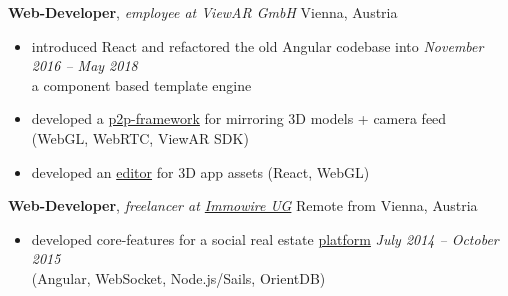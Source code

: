 \documentclass[9pt]{extarticle}
\begin{document}
\noindent
{\bf Web-Developer}, \textit{employee at ViewAR GmbH}  \hfill Vienna, Austria
\begin{itemize}
\setlength\itemsep{0.05em}
    \item introduced React and refactored the old Angular codebase into \hfill \textit{November 2016 -- May 2018} \\
    a component based template engine
    \item developed a \href{https://www.youtube.com/watch?v=0j-v-j9xEUQ}{p2p-framework} for mirroring 3D models + camera feed \\
    (WebGL, WebRTC, ViewAR SDK)
    \item developed an \href{https://www.youtube.com/watch?v=quE-erJ4PmU&t=113s}{editor} for 3D app assets (React, WebGL) \\
\end{itemize}

\noindent
{\bf Web-Developer}, \textit{freelancer at \href{https://youtu.be/cs-IyI_erZo?t=16}{Immowire UG}}  \hfill Remote from Vienna, Austria
\begin{itemize}
    \setlength\itemsep{0.05em}
\item developed core-features for a social real estate  \href{https://youtu.be/cs-IyI_erZo?t=16}{platform} \hfill \textit{July 2014 -- October 2015} \\ 
(Angular, WebSocket, Node.js/Sails, OrientDB)\\
\end{itemize}

\end{document}
